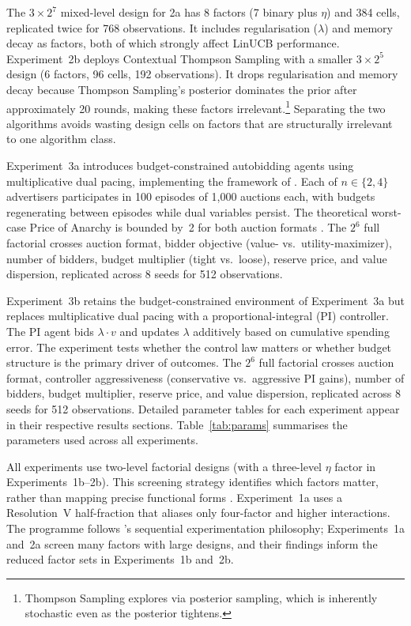 The $3 \times 2^7$ mixed-level design for 2a has 8 factors (7 binary plus $\eta$) and 384 cells, replicated twice for 768 observations. It includes regularisation ($\lambda$) and memory decay as factors, both of which strongly affect LinUCB performance. Experiment~2b deploys Contextual Thompson Sampling with a smaller $3 \times 2^5$ design (6 factors, 96 cells, 192 observations). It drops regularisation and memory decay because Thompson Sampling's posterior dominates the prior after approximately 20 rounds, making these factors irrelevant.\footnote{Thompson Sampling explores via posterior sampling, which is inherently stochastic even as the posterior tightens.} Separating the two algorithms avoids wasting design cells on factors that are structurally irrelevant to one algorithm class.

Experiment~3a introduces budget-constrained autobidding agents using multiplicative dual pacing, implementing the framework of \citet{Balseiro2019Learning}. Each of $n \in \{2, 4\}$ advertisers participates in 100 episodes of 1{,}000 auctions each, with budgets regenerating between episodes while dual variables persist. The theoretical worst-case Price of Anarchy is bounded by~2 for both auction formats \citep{Aggarwal2019, Gaitonde2023}. The $2^6$ full factorial crosses auction format, bidder objective (value- vs.\ utility-maximizer), number of bidders, budget multiplier (tight vs.\ loose), reserve price, and value dispersion, replicated across 8 seeds for 512 observations.

Experiment~3b retains the budget-constrained environment of Experiment~3a but replaces multiplicative dual pacing with a proportional-integral (PI) controller. The PI agent bids $\lambda \cdot v$ and updates $\lambda$ additively based on cumulative spending error. The experiment tests whether the control law matters or whether budget structure is the primary driver of outcomes. The $2^6$ full factorial crosses auction format, controller aggressiveness (conservative vs.\ aggressive PI gains), number of bidders, budget multiplier, reserve price, and value dispersion, replicated across 8 seeds for 512 observations. Detailed parameter tables for each experiment appear in their respective results sections. Table~\ref{tab:params} summarises the parameters used across all experiments.


All experiments use two-level factorial designs (with a three-level $\eta$ factor in Experiments~1b--2b). This screening strategy identifies which factors matter, rather than mapping precise functional forms \citep{Box2005, Montgomery2017}. Experiment~1a uses a Resolution~V half-fraction that aliases only four-factor and higher interactions. The programme follows \citeauthor{Box2005}'s sequential experimentation philosophy; Experiments~1a and~2a screen many factors with large designs, and their findings inform the reduced factor sets in Experiments~1b and~2b.


